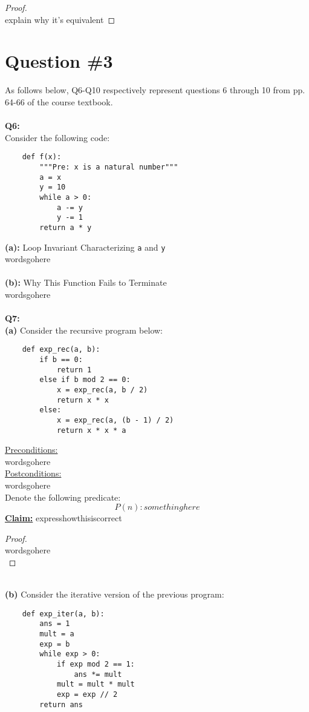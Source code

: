 \documentclass[12pt]{article}
\begin{document}
\begin{proof}
\leavevmode\\
    explain why it's equivalent
\end{proof}

\section*{Question \#3}
As follows below, Q6-Q10 respectively represent questions 6 through 10 from pp. 64-66 of the course textbook. \\
\\
\textbf{Q6:} \\
Consider the following code:
\begin{lstlisting}
    def f(x):
        """Pre: x is a natural number"""
        a = x
        y = 10
        while a > 0:
            a -= y
            y -= 1
        return a * y
\end{lstlisting}
\textbf{(a):} Loop Invariant Characterizing \texttt{a} and \texttt{y} \\
wordsgohere \\
\\
\textbf{(b):} Why This Function Fails to Terminate \\
wordsgohere \\
\\
\textbf{Q7:} \\
\textbf{(a)} Consider the recursive program below:
\begin{lstlisting}
    def exp_rec(a, b):
        if b == 0:
            return 1
        else if b mod 2 == 0:
            x = exp_rec(a, b / 2)
            return x * x
        else:
            x = exp_rec(a, (b - 1) / 2)
            return x * x * a
\end{lstlisting}
\underline{Preconditions:} \\
wordsgohere \\
\underline{Postconditions:} \\
wordsgohere \\
Denote the following predicate:
\[P(n): somethinghere\]
\textbf{\underline{Claim:}} expresshowthisiscorrect
\begin{proof}
\leavevmode\\
    wordsgohere \\
\end{proof}
\leavevmode\\
\textbf{(b)} Consider the iterative version of the previous program:
\begin{lstlisting}
    def exp_iter(a, b):
        ans = 1
        mult = a
        exp = b
        while exp > 0:
            if exp mod 2 == 1:
                ans *= mult
            mult = mult * mult
            exp = exp // 2
        return ans
\end{lstlisting}
\end{document}
